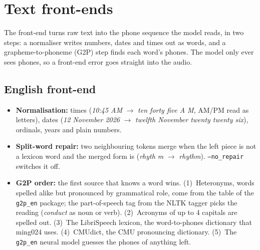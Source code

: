 \documentclass[11pt,a4paper]{article}
\newcommand{\code}[1]{\texttt{#1}}
\begin{document}
\section{Text front-ends}
\label{sec:frontends}
The front-end turns raw text into the phone sequence the model reads, in two steps: a normaliser writes
numbers, dates and times out as words, and a grapheme-to-phoneme (G2P) step finds each word's phones. The model
only ever sees phones, so a front-end error goes straight into the audio.

\subsection{English front-end}
\label{sec:en-frontend}
\begin{itemize}
\item \textbf{Normalisation:} times (\emph{10:45 AM} $\to$ \emph{ten forty five A M}, AM/PM read as letters),
dates (\emph{12 November 2026} $\to$ \emph{twelfth November twenty twenty six}), ordinals, years and plain numbers.
\item \textbf{Split-word repair:} two neighbouring tokens merge when the left piece is not a lexicon word and the
merged form is (\emph{rhyth m} $\to$ \emph{rhythm}). \code{--no\_repair} switches it off.
\item \textbf{G2P order:} the first source that knows a word wins. (1)~Heteronyms, words spelled alike but
pronounced by grammatical role, come from the table of the \code{g2p\_en} package; the part-of-speech tag from the
NLTK tagger picks the reading (\emph{conduct} as noun or verb). (2)~Acronyms of up to 4 capitals are spelled out.
(3)~The LibriSpeech lexicon, the word-to-phones dictionary that ming024 uses. (4)~CMUdict, the CMU pronouncing
dictionary. (5)~The \code{g2p\_en} neural model guesses the phones of anything left.
\end{itemize}
\end{document}
